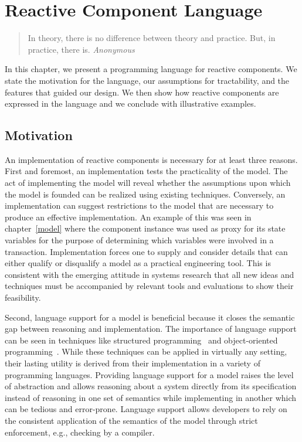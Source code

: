 \chapter{Reactive Component Language\label{language}}

\begin{quote}
In theory, there is no difference between theory and practice. \linebreak
But, in practice, there is.  \emph{Anonymous}
\end{quote}

In this chapter, we present a programming language for reactive components.
We state the motivation for the language, our assumptions for tractability, and the features that guided our design.
We then show how reactive components are expressed in the language and we conclude with illustrative examples.

\section{Motivation}

An implementation of reactive components is necessary for at least three reasons.
First and foremost, an implementation tests the practicality of the model.
The act of implementing the model will reveal whether the assumptions upon which the model is founded can be realized using existing techniques.
Conversely, an implementation can suggest restrictions to the model that are necessary to produce an effective implementation.
An example of this was seen in chapter~\ref{model} where the component instance was used as proxy for its state variables for the purpose of determining which variables were involved in a transaction.
Implementation forces one to supply and consider details that can either qualify or disqualify a model as a practical engineering tool.
This is consistent with the emerging attitude in systems research that all new ideas and techniques must be accompanied by relevant tools and evaluations to show their feasibility.

Second, language support for a model is beneficial because it closes the semantic gap between reasoning and implementation.
The importance of language support can be seen in techniques like structured programming~\cite{dahl1972structured} and object-oriented programming~\cite{booch1982object}.
While these techniques can be applied in virtually any setting, their lasting utility is derived from their implementation in a variety of programming languages.
Providing language support for a model raises the level of abstraction and allows reasoning about a system directly from its specification instead of reasoning in one set of semantics while implementing in another which can be tedious and error-prone.
Language support allows developers to rely on the consistent application of the semantics of the model through strict enforcement, e.g., checking by a compiler.

